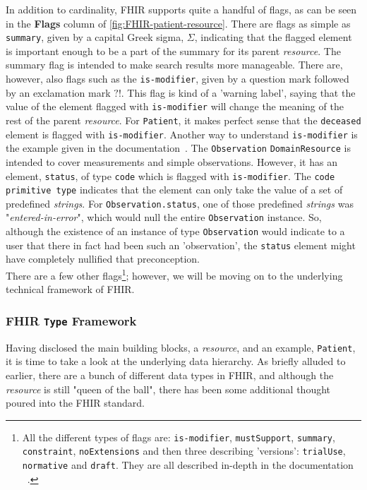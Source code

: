 \noindent
In addition to cardinality, FHIR supports quite a handful of flags, as can be seen in the \textbf{Flags} column of \autoref{fig:FHIR-patient-resource}. There are flags as simple as \texttt{summary}, given by a capital Greek sigma, $\Sigma$, indicating that the flagged element is important enough to be a part of the summary for its parent \emph{resource}. The summary flag is intended to make search results more manageable. There are, however, also flags such as the \texttt{is-modifier}, given by a question mark followed by an exclamation mark $?!$. This flag is kind of a 'warning label', saying that the value of the element flagged with \texttt{is-modifier} will change the meaning of the rest of the parent \emph{resource}. For \texttt{Patient}, it makes perfect sense that the \texttt{deceased} element is flagged with \texttt{is-modifier}. Another way to understand \texttt{is-modifier} is the example given in the documentation~\cite{FHIR-isModifier-flag}. The \texttt{Observation} \texttt{DomainResource} is intended to cover measurements and simple observations. However, it has an element, \texttt{status}, of type \texttt{code} which is flagged with \texttt{is-modifier}. The \texttt{code} \texttt{primitive type} indicates that the element can only take the value of a set of predefined \emph{strings}. For \texttt{Observation.status}, one of those predefined \emph{strings} was "\emph{entered-in-error}", which would null the entire \texttt{Observation} instance. So, although the existence of an instance of type \texttt{Observation} would indicate to a user that there in fact had been such an 'observation', the \texttt{status} element might have completely nullified that preconception. 
\\
There are a few other flags\footnote{All the different types of flags are: \texttt{is-modifier}, \texttt{mustSupport}, \texttt{summary}, \texttt{constraint}, \texttt{noExtensions} and then three describing 'versions': \texttt{trialUse}, \texttt{normative} and \texttt{draft}. They are all described in-depth in the documentation ~\cite{FHIR-flags-overview}.}; however, we will be moving on to the underlying technical framework of FHIR.

\subsubsection*{FHIR \texttt{Type} Framework}
Having disclosed the main building blocks, a \emph{resource}, and an example, \texttt{Patient}, it is time to take a look at the underlying data hierarchy. As briefly alluded to earlier, there are a bunch of different data types in FHIR, and although the \emph{resource} is still "queen of the ball", there has been some additional thought poured into the FHIR standard.

